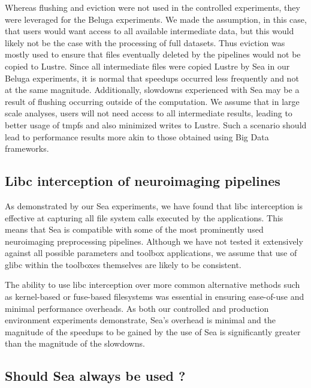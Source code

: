    Whereas flushing and eviction were not used in the controlled experiments,
    they were leveraged for the Beluga experiments. We made the assumption, in
    this case, that users would want access to all available intermediate data,
    but this would likely not be the case with the processing of full datasets.
    Thus eviction was mostly used to ensure that files eventually deleted by the
    pipelines would not be copied to Lustre. Since all intermediate files were
    copied Lustre by Sea in our Beluga experiments, it is normal that speedups
    occurred less frequently and not at the same magnitude. Additionally, slowdowns
    experienced with Sea may be a result of flushing occurring outside of the computation.
    We assume that in large scale analyses, users will not need access to all intermediate
    results, leading to better usage of tmpfs and also minimized writes to Lustre. Such a
    scenario should lead to performance results more akin to those obtained using Big Data
    frameworks.

    \subsection{Libc interception of neuroimaging pipelines}
    
    As demonstrated by our Sea experiments, we have found that libc interception
    is effective at capturing all file system calls executed by the
    applications. This means that Sea is compatible with some of the most prominently
    used neuroimaging preprocessing pipelines. Although we have not tested it extensively
    against all possible parameters and toolbox applications, we assume that use
    of glibc within the toolboxes themselves are likely to be consistent.
    
    The ability to use libc interception over more common alternative methods
    such as kernel-based or fuse-based filesystems was essential in ensuring
    ease-of-use and minimal performance overheads. As both our controlled and production
    environment experiments demonstrate, Sea's overhead is minimal and the magnitude of the
    speedups to be gained by the use of Sea is significantly greater than the magnitude of the
    slowdowns.
    
    \subsection{Should Sea always be used ?}
    
